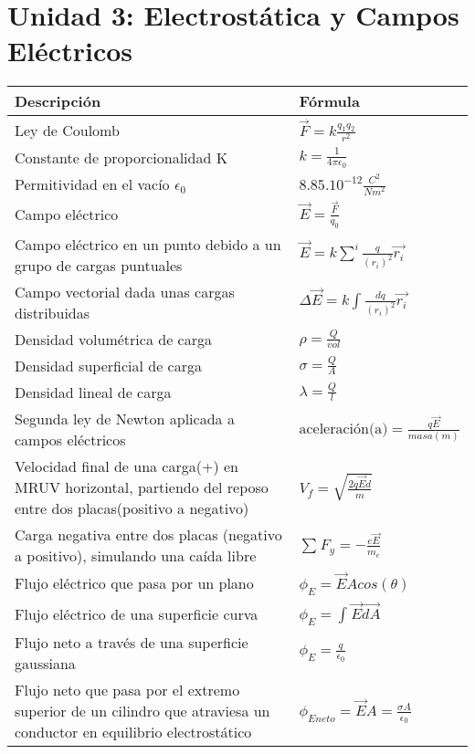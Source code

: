 \documentclass[a4paper,12pt]{article}
\begin{document}
	\section{Unidad 3: Electrostática y Campos Eléctricos}
	\renewcommand{\arraystretch}{1.5}
	\begin{center}
		\begin{tabularx}{\textwidth}{|X|X|}
			\hline
			\textbf{Descripción} & \textbf{Fórmula} \\ \hline
			Ley de Coulomb & ${\vec{F}} = k \frac{{q_1}{q_2}}{r^2}$ \\ \hline
			Constante de proporcionalidad K & $k = \frac{1}{4 \pi {\epsilon}_0}$ \\ \hline
			Permitividad en el vacío ${{\epsilon}_0}$ & $8.85 . 10^{-12} \frac{C^2}{Nm^2}$ \\ \hline
			Campo eléctrico & ${\vec{E}} = \frac{\vec{F}}{q_0}$ \\ \hline
			Campo eléctrico en un punto debido a un grupo de cargas puntuales & ${\vec{E}} = k \sum_{}^{i} {\frac{q}{{(r_i)}^2}} {\vec{r_i}}$ \\ \hline
			Campo vectorial dada unas cargas distribuidas & $\Delta \vec{E} = k \int_{}^{} \frac{dq}{(r_i)^2} \vec{r_i}$ \\ \hline
			Densidad volumétrica de carga & $\rho = \frac{Q}{vol}$ \\ \hline
			Densidad superficial de carga & $\sigma = \frac{Q}{A}$ \\ \hline
			Densidad lineal de carga & $\lambda = \frac{Q}{l}$ \\ \hline
			Segunda ley de Newton aplicada a campos eléctricos & $\text{aceleración(a)} = \frac{q \vec{E}}{masa(m)}$ \\ \hline
			Velocidad final de una carga(+) en MRUV horizontal, partiendo del reposo entre dos placas(positivo a negativo) & ${V_f} = \sqrt{ \frac{2q \vec{E} d}{m}}$ \\ \hline
			Carga negativa entre dos placas (negativo a positivo), simulando una caída libre & $\sum_{} {F_y} = - \frac{e \vec{E}}{m_e}$ \\ \hline
			Flujo eléctrico que pasa por un plano & ${{\phi}_E} = \vec{E} A cos(\theta)$ \\ \hline
			Flujo eléctrico de una superficie curva & ${{\phi}_E} = \int_{} \vec{E} \vec{dA}$ \\ \hline
			Flujo neto a través de una superficie gaussiana & ${{\phi}_E} = \frac{q}{{\epsilon}_0}$ \\ \hline
			Flujo neto que pasa por el extremo superior de un cilindro que atraviesa un conductor en equilibrio electrostático & ${{\phi}_{E neto}} = \vec{E} A = \frac{\sigma A}{\epsilon_0}$ \\ \hline			
			\end{tabularx}
	\end{center}
\end{document}
